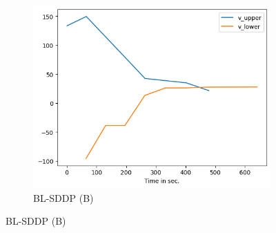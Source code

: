 \documentclass[a4paper,12pt]{article}
\begin{document}
\begin{figure}[h]
\begin{subfigure}{0.32\textwidth}
  \includegraphics[width=\linewidth]{blsddp_6_best.png}
  \caption{BL-SDDP (B)}
  \label{fig:3}
\end{subfigure}


\end{figure}
\end{document}
